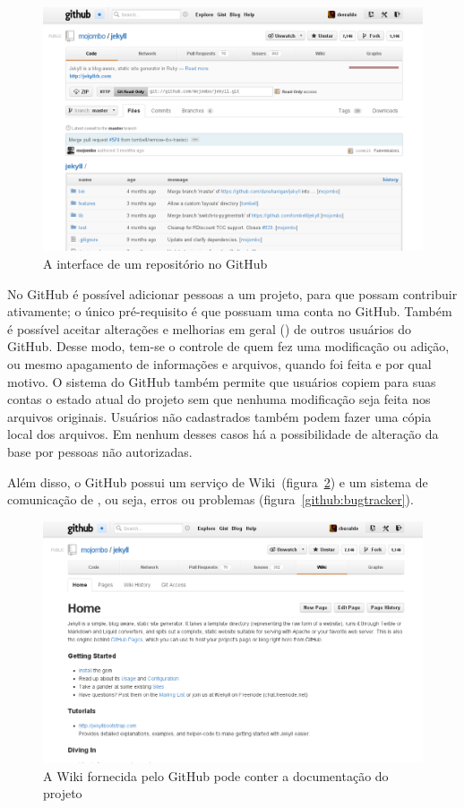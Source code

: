 \begin{figure}[h]
  \centering
  \includegraphics[width=.9\textwidth]{img/repositorio.png}
  \caption{A interface de um repositório no GitHub}
  \label{github:repositorio}
\end{figure}

No GitHub é possível adicionar pessoas a um projeto, para que possam
contribuir ativamente; o único pré-requisito é que possuam uma conta no GitHub.
Também é possível aceitar alterações e melhorias em geral () de outros usuários do GitHub. Desse modo, tem-se o controle de
quem fez uma modificação ou adição, ou mesmo apagamento de informações e
arquivos, quando foi feita e por qual motivo. O sistema do GitHub também
permite que usuários copiem para suas contas o estado atual do projeto sem que
nenhuma modificação seja feita nos arquivos originais. Usuários não cadastrados
também podem fazer uma cópia local dos arquivos. Em nenhum desses casos há a
possibilidade de alteração da base por pessoas não autorizadas.

Além disso, o GitHub possui um serviço de Wiki~(figura~\ref{github:wiki}) e um
sistema de comunicação de , ou seja, erros ou problemas
(figura~\ref{github:bugtracker}).

\begin{figure}[h]
  \centering
  \includegraphics[width=.9\textwidth]{img/wiki.png}
  \caption{A Wiki fornecida pelo GitHub pode conter a documentação do projeto}
  \label{github:wiki}
\end{figure}

